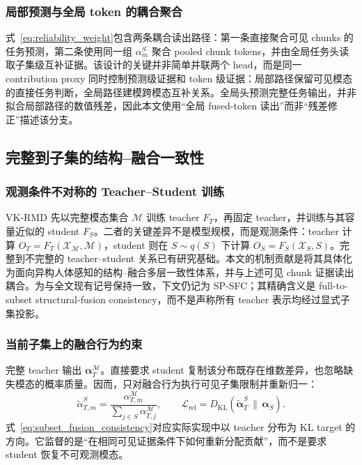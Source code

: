\documentclass[journal]{IEEEtran}
\begin{document}
\subsubsection{局部预测与全局 token 的耦合聚合}

式~\eqref{eq:reliability_weight}包含两条耦合读出路径：第一条直接聚合可见 chunks 的任务预测，第二条使用同一组 $\alpha_m^S$ 聚合 pooled chunk tokens，并由全局任务头读取子集级互补证据。该设计的关键并非简单并联两个 head，而是同一 contribution proxy 同时控制预测级证据和 token 级证据：局部路径保留可见模态的直接任务判断，全局路径建模跨模态互补关系。全局头预测完整任务输出，并非拟合局部路径的数值残差，因此本文使用“全局 fused-token 读出”而非“残差修正”描述该分支。

\subsection{完整到子集的结构--融合一致性}

\subsubsection{观测条件不对称的 Teacher--Student 训练}

VK-RMD 先以完整模态集合 $\mathcal M$ 训练 teacher $F_T$，再固定 teacher，并训练与其容量近似的 student $F_S$。二者的关键差异不是模型规模，而是观测条件：teacher 计算 $O_T=F_T(\mathcal X_{\mathcal M},\mathcal M)$，student 则在 $S\sim q(S)$ 下计算 $O_S=F_S(\mathcal X_S,S)$。完整到不完整的 teacher--student 关系已有研究基础\cite{mmanet,kd,fitnets}。本文的机制贡献是将其具体化为面向异构人体感知的结构--融合多层一致性体系，并与上述可见 chunk 证据读出耦合。为与全文现有记号保持一致，下文仍记为 SP-SFC；其精确含义是 full-to-subset structural-fusion consistency，而不是声称所有 teacher 表示均经过显式子集投影。

\subsubsection{当前子集上的融合行为约束}

完整 teacher 输出 $\boldsymbol\alpha_T^{\mathcal M}$。直接要求 student 复制该分布既存在维数差异，也忽略缺失模态的概率质量。因而，只对融合行为执行可见子集限制并重新归一：
\begin{equation}
\widetilde\alpha_{T,m}^{S}
=\frac{\alpha_{T,m}^{\mathcal M}}{\sum_{j\in S}\alpha_{T,j}^{\mathcal M}},\qquad
\mathcal L_{\mathrm{rel}}=D_{\mathrm{KL}}\!\left(
\widetilde{\boldsymbol\alpha}_T^S\,\|\,\boldsymbol\alpha_S\right).
    \label{eq:subset_fusion_consistency}
\end{equation}
式~\eqref{eq:subset_fusion_consistency}对应实际实现中以 teacher 分布为 KL target 的方向。它监督的是“在相同可见证据条件下如何重新分配贡献”，而不是要求 student 恢复不可观测模态。
\end{document}
